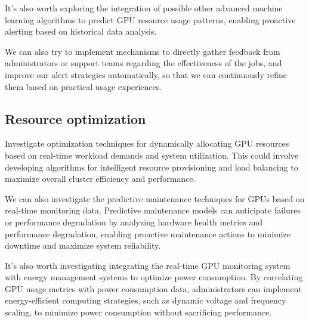 It's also worth exploring the integration of possible other advanced machine learning algorithms to predict GPU resource usage patterns, enabling proactive alerting based on historical data analysis.

We can also try to implement mechanisms to directly gather feedback from administrators or support teams regarding the effectiveness of the jobs, and improve our alert strategies automatically, so that we can continuously refine them based on practical usage experiences.

\subsection{Resource optimization}
Investigate optimization techniques for dynamically allocating GPU resources based on real-time workload demands and system utilization. This could involve developing algorithms for intelligent resource provisioning and load balancing to maximize overall cluster efficiency and performance.

We can also investigate the predictive maintenance techniques for GPUs based on real-time monitoring data. Predictive maintenance models can anticipate failures or performance degradation by analyzing hardware health metrics and performance degradation, enabling proactive maintenance actions to minimize downtime and maximize system reliability.

It's also worth investigating integrating the real-time GPU monitoring system with energy management systems to optimize power consumption. By correlating GPU usage metrics with power consumption data, administrators can implement energy-efficient computing strategies, such as dynamic voltage and frequency scaling, to minimize power consumption without sacrificing performance.
